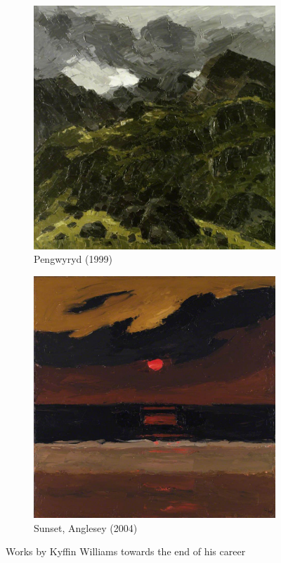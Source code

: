 \documentclass[11pt,fleqn,twoside]{article}
\begin{document}
\begin{figure}[h]
\centering
\begin{subfigure}[b]{0.4\textwidth}
  \centering
  \includegraphics[width=\textwidth]{img/nlw_nlw_gcf06690_large.jpg}
  \caption{Pengwyryd (1999)}
\end{subfigure}
\begin{subfigure}[b]{0.4\textwidth}
  \centering
  \includegraphics[width=\textwidth]{img/nlw_nlw_gcf08104_large.jpg}
  \caption{Sunset, Anglesey (2004)}
\end{subfigure}
\caption{Works by Kyffin Williams towards the end of his career}
\label{fig:kyffin-late}
\end{figure}
\end{document}
